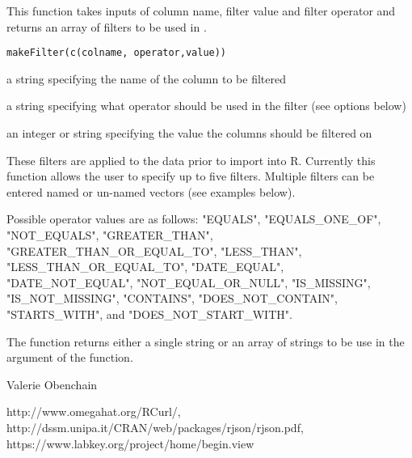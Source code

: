 \documentclass{article}
\begin{document}
\begin{Description}\relax
This function takes inputs of column name, filter value and filter operator and 
returns an array of filters to be used in .
\end{Description}
\begin{Usage}
\begin{verbatim}
makeFilter(c(colname, operator,value))
\end{verbatim}
\end{Usage}
\begin{Arguments}
\begin{ldescription}
\item[\code{colname}] a string specifying the name of the column to be filtered
\item[\code{operator}] a string specifying what operator should be used in the filter (see options below)
\item[\code{value}] an integer or string specifying the value the columns should be filtered on
\end{ldescription}
\end{Arguments}
\begin{Details}\relax
These filters are applied to the data prior to import into R. Currently this function
allows the user to specify up to five filters. Multiple filters can be entered named or
un-named vectors (see examples below).

Possible operator values are as follows:
"EQUALS", "EQUALS\_ONE\_OF", "NOT\_EQUALS", "GREATER\_THAN", "GREATER\_THAN\_OR\_EQUAL\_TO", "LESS\_THAN",
"LESS\_THAN\_OR\_EQUAL\_TO", "DATE\_EQUAL", "DATE\_NOT\_EQUAL", "NOT\_EQUAL\_OR\_NULL",
"IS\_MISSING", "IS\_NOT\_MISSING", "CONTAINS", "DOES\_NOT\_CONTAIN", "STARTS\_WITH", and "DOES\_NOT\_START\_WITH".
\end{Details}
\begin{Value}
The function returns either a single string or an array of strings to be use in the
 argument of the  function.
\end{Value}
\begin{Author}\relax
Valerie Obenchain
\end{Author}
\begin{References}\relax
http://www.omegahat.org/RCurl/, \\
http://dssm.unipa.it/CRAN/web/packages/rjson/rjson.pdf,\\
https://www.labkey.org/project/home/begin.view
\end{References}
\end{document}
